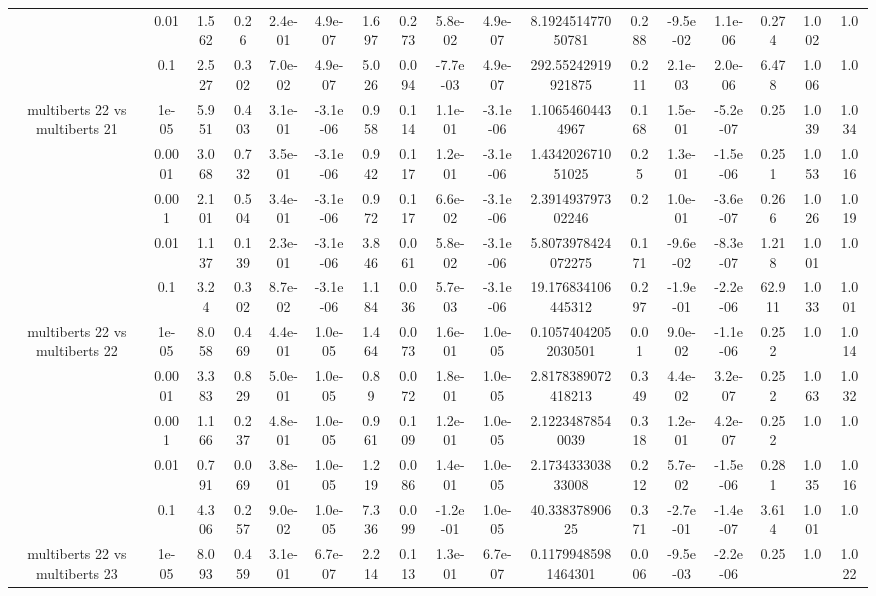 \begin{tabular}{|c|c|c|c|c|c|c|c|c|c|c|c|c|c|c|c|c|}
 & 0.01 & 1.562 & 0.26 & 2.4e-01 & 4.9e-07 & 1.697 & 0.273 & 5.8e-02 & 4.9e-07 & 8.192451477050781 & 0.288 & -9.5e-02 & 1.1e-06 & 0.274 & 1.002 & 1.0 \\
 & 0.1 & 2.527 & 0.302 & 7.0e-02 & 4.9e-07 & 5.026 & 0.094 & -7.7e-03 & 4.9e-07 & 292.55242919921875 & 0.211 & 2.1e-03 & 2.0e-06 & 6.478 & 1.006 & 1.0 \\
\hline
\multirow{5}{*}{multiberts 22 vs multiberts 21} & 1e-05 & 5.951 & 0.403 & 3.1e-01 & -3.1e-06 & 0.958 & 0.114 & 1.1e-01 & -3.1e-06 & 1.10654604434967 & 0.168 & 1.5e-01 & -5.2e-07 & 0.25 & 1.039 & 1.034 \\
 & 0.0001 & 3.068 & 0.732 & 3.5e-01 & -3.1e-06 & 0.942 & 0.117 & 1.2e-01 & -3.1e-06 & 1.434202671051025 & 0.25 & 1.3e-01 & -1.5e-06 & 0.251 & 1.053 & 1.016 \\
 & 0.001 & 2.101 & 0.504 & 3.4e-01 & -3.1e-06 & 0.972 & 0.117 & 6.6e-02 & -3.1e-06 & 2.391493797302246 & 0.2 & 1.0e-01 & -3.6e-07 & 0.266 & 1.026 & 1.019 \\
 & 0.01 & 1.137 & 0.139 & 2.3e-01 & -3.1e-06 & 3.846 & 0.061 & 5.8e-02 & -3.1e-06 & 5.8073978424072275 & 0.171 & -9.6e-02 & -8.3e-07 & 1.218 & 1.001 & 1.0 \\
 & 0.1 & 3.24 & 0.302 & 8.7e-02 & -3.1e-06 & 1.184 & 0.036 & 5.7e-03 & -3.1e-06 & 19.176834106445312 & 0.297 & -1.9e-01 & -2.2e-06 & 62.911 & 1.033 & 1.001 \\
\hline
\multirow{5}{*}{multiberts 22 vs multiberts 22} & 1e-05 & 8.058 & 0.469 & 4.4e-01 & 1.0e-05 & 1.464 & 0.073 & 1.6e-01 & 1.0e-05 & 0.10574042052030501 & 0.01 & 9.0e-02 & -1.1e-06 & 0.252 & 1.0 & 1.014 \\
 & 0.0001 & 3.383 & 0.829 & 5.0e-01 & 1.0e-05 & 0.89 & 0.072 & 1.8e-01 & 1.0e-05 & 2.8178389072418213 & 0.349 & 4.4e-02 & 3.2e-07 & 0.252 & 1.063 & 1.032 \\
 & 0.001 & 1.166 & 0.237 & 4.8e-01 & 1.0e-05 & 0.961 & 0.109 & 1.2e-01 & 1.0e-05 & 2.12234878540039 & 0.318 & 1.2e-01 & 4.2e-07 & 0.252 & 1.0 & 1.0 \\
 & 0.01 & 0.791 & 0.069 & 3.8e-01 & 1.0e-05 & 1.219 & 0.086 & 1.4e-01 & 1.0e-05 & 2.173433303833008 & 0.212 & 5.7e-02 & -1.5e-06 & 0.281 & 1.035 & 1.016 \\
 & 0.1 & 4.306 & 0.257 & 9.0e-02 & 1.0e-05 & 7.336 & 0.099 & -1.2e-01 & 1.0e-05 & 40.33837890625 & 0.371 & -2.7e-01 & -1.4e-07 & 3.614 & 1.001 & 1.0 \\
\hline
\multirow{5}{*}{multiberts 22 vs multiberts 23} & 1e-05 & 8.093 & 0.459 & 3.1e-01 & 6.7e-07 & 2.214 & 0.113 & 1.3e-01 & 6.7e-07 & 0.11799485981464301 & 0.006 & -9.5e-03 & -2.2e-06 & 0.25 & 1.0 & 1.022 \\

\end{tabular}
